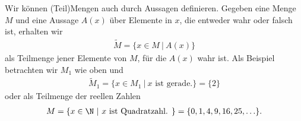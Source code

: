 \documentclass[letterpaper,10pt,english]{jupyterBook}
\begin{document}
Wir können (Teil)Mengen auch durch Aussagen definieren. Gegeben eine Menge \(M\) und eine Aussage \(A(x)\) über Elemente in \(x\), die entweder wahr oder falsch ist, erhalten wir
\begin{equation*}
\begin{split} \tilde M = \{ x\in M ~|~A(x)\}\end{split}
\end{equation*}
als Teilmenge jener Elemente von \(M\), für die \(A(x)\) wahr ist. Als Beispiel betrachten wir \(M_1\) wie oben und
\begin{equation*}
\begin{split} \tilde M_1 = \{x \in M_1 ~|~x \text{ ist gerade.}\} = \{2\}\end{split}
\end{equation*}
oder als Teilmenge der reellen Zahlen
\begin{equation*}
\begin{split} M = \{ x \in \N~|~x \text{ ist Quadratzahl. }\} = \{0,1,4,9,16,25,\ldots\}.\end{split}
\end{equation*}
\end{document}
